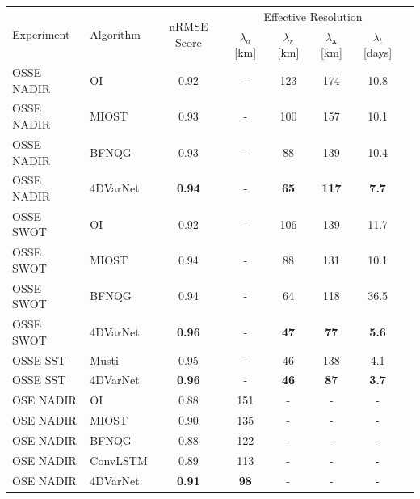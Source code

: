 \begin{table}[ht]
\label{tb:exp-results-mega}
\centering
\begin{tabular}{llcccccc}
 \toprule
\multirow{2}{*}{Experiment} &  \multirow{2}{*}{Algorithm} &   \multirow{2}{*}{nRMSE Score} &
\multicolumn{4}{c}{Effective Resolution} \\
& & & $\lambda_{a}$ [km] & $\lambda_{r}$ [km]   &  $\lambda_{\mathbf{x}}$ [km]  &   $\lambda_{t}$ [days]      \\ \midrule
OSSE NADIR     &  OI & 0.92 & - & 123 & 174 & 10.8 \\
OSSE NADIR     &  MIOST &  0.93 & - & 100 & 157 & 10.1 \\
OSSE NADIR     &  BFNQG & 0.93 & - & 88 & 139 & 10.4 \\
OSSE NADIR &  4DVarNet &  \textbf{0.94} & - & \textbf{65} & \textbf{117} & \textbf{7.7} \\
\midrule
OSSE SWOT     &  OI & 0.92 & - & 106 & 139 & 11.7 \\
OSSE SWOT     &  MIOST &  0.94 & - & 88 & 131 & 10.1 \\
OSSE SWOT     &  BFNQG & 0.94 & - & 64 & 118 & 36.5 \\
OSSE SWOT &  4DVarNet &  \textbf{0.96} & - & \textbf{47} & \textbf{77} & \textbf{5.6} \\
\midrule
OSSE SST     &  Musti & 0.95 & - & 46 & 138 & 4.1 \\
OSSE SST &  4DVarNet &  \textbf{0.96} & - & \textbf{46} & \textbf{87} & \textbf{3.7} \\
\midrule
OSE NADIR     &  OI & 0.88 & 151 & - &  - &  -\\
OSE NADIR     &  MIOST &  0.90 & 135 & - &  - &  -\\
OSE NADIR     &  BFNQG & 0.88 & 122 & - & - &  -\\
OSE NADIR &  ConvLSTM &  0.89 & 113 &- &  - &  -\\
OSE NADIR &  4DVarNet & \textbf{0.91} & \textbf{98} & - &  -  &  -\\
\bottomrule
\end{tabular}
\end{table}

